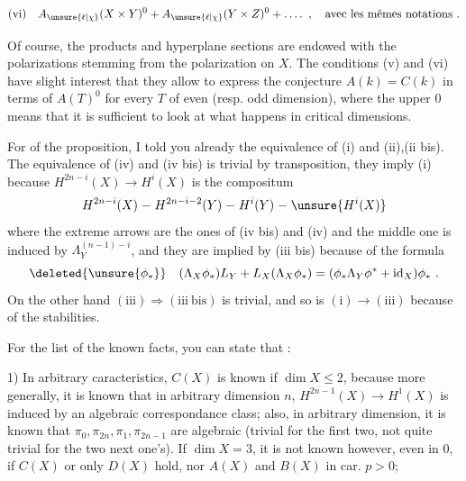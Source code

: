 
\[
\text{(vi)}\quad A_{\unsure{\ell|\chi}}(X\times Y)^0+A_{\unsure{\ell|\chi}}(Y\times Z)^0+\mathinner{\ldotp\ldotp\ldotp\ldotp}\ ,\quad\text{avec les mêmes notations .}
\]

Of course, the products and hyperplane sections are endowed with the polarizations stemming from the polarization on $X$. The conditions (v) and (vi) have  slight interest that they allow to express the conjecture $A(k)=C(k)$ in terms of $A(T)^0$ for every $T$ of even (resp. odd dimension), where the upper $0$ means that it is sufficient to look at what happens in critical dimensions.

For  of the proposition, I told you already the equivalence of (i) and (ii),(ii bis). The equivalence of (iv) and (iv bis) is trivial by transposition, they  imply (i) because $H^{2n-i}(X)\to H^i(X)$ is the compositum
\[
H^{2n-i}(X)\mathrel{-}H^{2n-i-2}(Y)\mathrel{-}H^i(Y)\mathrel{-}\unsure{H^i(X)}
\]
where the extreme arrows are the ones of (iv bis) and (iv) and the middle one is induced by $\Lambda_Y^{(n-1)-i}$, and they are implied by (iii bis) because of the formula
\[
\deleted{\unsure{\phi_*}}\quad(\Lambda_X\phi_*)L_Y+L_X(\Lambda_X\phi_*)=(\phi_*\Lambda_Y\phi^*+\operatorname{id}_X)\phi_*\ .
\]
On the other hand $(\mathrm{iii})\Rightarrow(\mathrm{iii\ bis})$ is trivial, and so is $(\mathrm{i})\longrightarrow(\mathrm{iii})$ because of the stabilities.

For the list of the known facts, you can state that :

1) In arbitrary caracteristics, $C(X)$ is known if $\dim X\leq2$, because more generally, it is known that in arbitrary dimension $n$, $H^{2n-1}(X)\to H^1(X)$ is induced by an algebraic correspondance class; also, in arbitrary dimension, it is known that $\pi_0,\pi_{2n},\pi_1,\pi_{2n-1}$ are algebraic (trivial for the first two, not quite trivial for the two next one's). If $\dim X=3$, it is not known however, even in  $0$, if $C(X)$ or only $D(X)$ hold, nor $A(X)$ and $B(X)$ in car. $p>0$;

